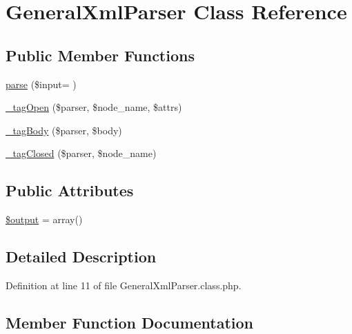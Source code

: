 \hypertarget{classGeneralXmlParser}{}\section{General\+Xml\+Parser Class Reference}
\label{classGeneralXmlParser}
\subsection*{Public Member Functions}
\begin{DoxyCompactItemize}
\item 
\hyperlink{classGeneralXmlParser_a908eec0715e2c7470a18e149a092f300}{parse} (\$input= \textquotesingle{}\textquotesingle{})
\item 
\hyperlink{classGeneralXmlParser_a2921aab91afa276ce9f6c75cf483e80d}{\+\_\+tag\+Open} (\$parser, \$node\+\_\+name, \$attrs)
\item 
\hyperlink{classGeneralXmlParser_a78c57730ac9d216ba88c02eb2f3c2903}{\+\_\+tag\+Body} (\$parser, \$body)
\item 
\hyperlink{classGeneralXmlParser_a4609e66c695acd3f1a85450228f0b79b}{\+\_\+tag\+Closed} (\$parser, \$node\+\_\+name)
\end{DoxyCompactItemize}
\subsection*{Public Attributes}
\begin{DoxyCompactItemize}
\item 
\hyperlink{classGeneralXmlParser_a33ef1b950659188b06d8586c366f8fe2}{\$output} = array()
\end{DoxyCompactItemize}


\subsection{Detailed Description}


Definition at line 11 of file General\+Xml\+Parser.\+class.\+php.



\subsection{Member Function Documentation}
\hypertarget{classGeneralXmlParser_a78c57730ac9d216ba88c02eb2f3c2903}{}
